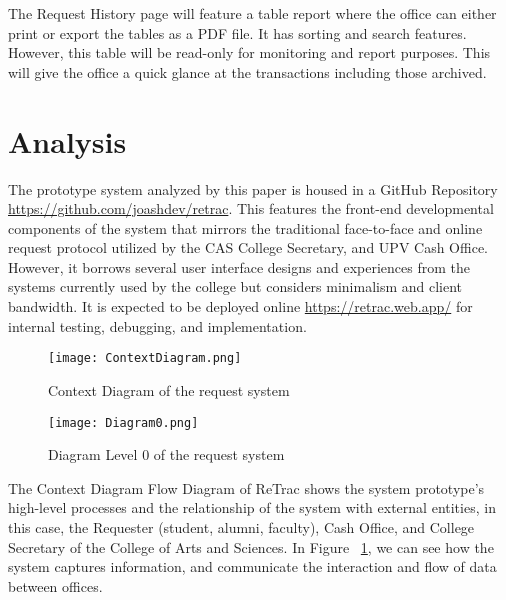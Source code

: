 The Request History page will feature a table report where the office can either print or export the tables as a PDF file. It has sorting and search features. However, this table will be read-only for monitoring and report purposes. This will give the office a quick glance at the transactions including those archived.

\section{Analysis}
The prototype system analyzed by this paper is housed in a GitHub Repository \url{https://github.com/joashdev/retrac}. This features the front-end developmental components of the system that mirrors the traditional face-to-face and online request protocol utilized by the CAS College Secretary, and UPV Cash Office. However, it borrows several user interface designs and experiences from the systems currently used by the college but considers minimalism and client bandwidth. It is expected to be deployed online \url{https://retrac.web.app/} for internal testing, debugging, and implementation.

    \begin{figure}[h]
        \centering 
        \begin{minipage}[c]{0.8\linewidth}
            \centering
            \texttt{[image: ContextDiagram.png]}
            \caption{Context Diagram of the request system}
            \label{fig:ContextDiagram}
        \end{minipage}
    \end{figure}
    
    \begin{figure}[h]
        \centering 
        \begin{minipage}[c]{0.9\linewidth}
            \centering
            \texttt{[image: Diagram0.png]}
            \caption{Diagram Level 0 of the request system}
            \label{fig:Diagram0}
        \end{minipage}
    \end{figure}
    
The Context Diagram Flow Diagram of ReTrac shows the system prototype’s high-level processes and the relationship of the system with external entities, in this case, the Requester (student, alumni, faculty), Cash Office, and College Secretary of the College of Arts and Sciences. In Figure ~\ref{fig:ContextDiagram}, we can see how the system captures information, and communicate the interaction and flow of data between offices. 

